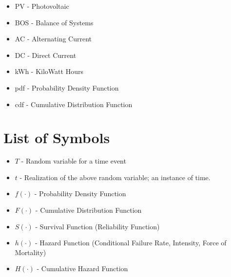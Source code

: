 \begin{itemize}

\item PV -  Photovoltaic
\item BOS - Balance of Systems
\item AC - Alternating Current
\item DC - Direct Current
\item kWh - KiloWatt Hours

\item pdf - Probability Density Function
\item cdf - Cumulative Distribution Function


\end{itemize}

\section*{List of Symbols}

\begin{itemize}

\item $T$ - Random variable for a time event
\item $t$ - Realization of the above random variable; an instance of time.
\item $f(\cdot)$ - Probability Density Function
\item $F(\cdot)$ - Cumulative Distribution Function
\item $S(\cdot)$ - Survival Function (Reliability Function)
\item $h(\cdot)$ - Hazard Function (Conditional Failure Rate, Intensity, Force of Mortality)
\item $H(\cdot)$ - Cumulative Hazard Function

\end{itemize}

